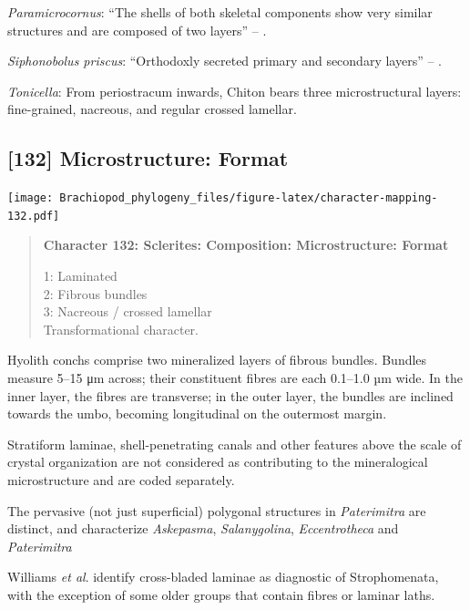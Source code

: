 \documentclass[openany]{book}
\begin{document}
\hypertarget{Paramicrocornus-coding-131}{}
\emph{Paramicrocornus}: ``The shells of both skeletal components show
very similar structures and are composed of two layers'' --
\citet{Zhang2018Ahyolithid}.

\hypertarget{Siphonobolus_priscus-coding-131}{}
\emph{Siphonobolus priscus}: ``Orthodoxly secreted primary and secondary
layers'' -- \citet{Williams2004Chemicostructure}.

\hypertarget{Tonicella-coding-131}{}
\emph{Tonicella}: From periostracum inwards, Chiton bears three
microstructural layers: fine-grained, nacreous, and regular crossed
lamellar.

\subsection*{{[}132{]} Microstructure:
Format}\label{microstructure-format}

\texttt{[image: Brachiopod\_phylogeny\_files/figure-latex/character-mapping-132.pdf]}

\begin{quote}
\textbf{Character 132: Sclerites: Composition: Microstructure: Format}

1: Laminated\\
2: Fibrous bundles\\
3: Nacreous / crossed lamellar\\
Transformational character.
\end{quote}

Hyolith conchs comprise two mineralized layers of fibrous bundles.
Bundles measure 5--15 μm across; their constituent fibres are each
0.1--1.0 µm wide. In the inner layer, the fibres are transverse; in the
outer layer, the bundles are inclined towards the umbo, becoming
longitudinal on the outermost margin.

Stratiform laminae, shell-penetrating canals and other features above
the scale of crystal organization are not considered as contributing to
the mineralogical microstructure and are coded separately.

The pervasive (not just superficial) polygonal structures in
\emph{Paterimitra} are distinct, and characterize \emph{Askepasma},
\emph{Salanygolina}, \emph{Eccentrotheca} and \emph{Paterimitra}
\citep{Larsson2014iPaterimitra}

Williams \emph{et al}.
\citeyearpar{Williams2000LinguliformeaCraniiformea} identify
cross-bladed laminae as diagnostic of Strophomenata, with the exception
of some older groups that contain fibres or laminar laths.
\end{document}
